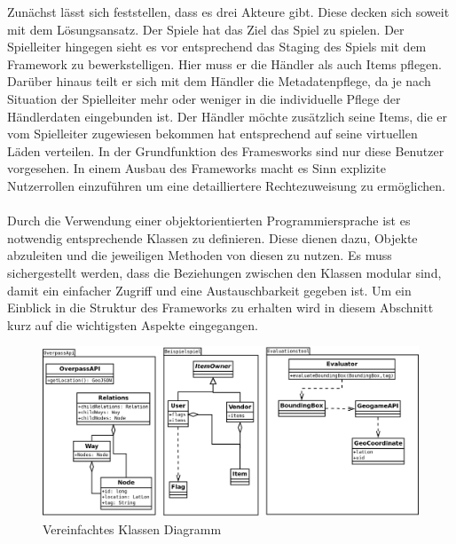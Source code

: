 Zunächst lässt sich feststellen, dass es drei Akteure gibt.
Diese decken sich soweit mit dem Lösungsansatz.
Der Spiele hat das Ziel das Spiel zu spielen. Der Spielleiter hingegen sieht es vor entsprechend das Staging des Spiels mit dem Framework zu bewerkstelligen.
Hier muss er die Händler als auch Items pflegen. Darüber hinaus teilt er sich mit dem Händler die Metadatenpflege, da je nach Situation der Spielleiter mehr oder weniger in die individuelle Pflege der Händlerdaten eingebunden ist. Der Händler möchte zusätzlich seine Items, die er vom Spielleiter zugewiesen bekommen hat entsprechend auf seine virtuellen Läden verteilen. In der Grundfunktion des Framesworks sind nur diese Benutzer vorgesehen. In einem Ausbau des Frameworks macht es Sinn explizite Nutzerrollen einzuführen um eine detailliertere Rechtezuweisung zu ermöglichen.
\\\\
Durch die Verwendung einer objektorientierten Programmiersprache ist es notwendig entsprechende Klassen zu definieren.
Diese dienen dazu, Objekte abzuleiten und die jeweiligen Methoden von diesen zu nutzen.
Es muss sichergestellt werden, dass die Beziehungen zwischen den Klassen modular sind, damit ein einfacher Zugriff und eine Austauschbarkeit gegeben ist.
Um ein Einblick in die Struktur des Frameworks zu erhalten wird in diesem Abschnitt kurz auf die wichtigsten Aspekte eingegangen.


\begin{figure}[H]
\begin{center}
\includegraphics[width=150mm]{images/ch5_img07_classes.png}
\caption{Vereinfachtes Klassen Diagramm}
\label{img:ch5_img07_classes}
\end{center}
\end{figure}

